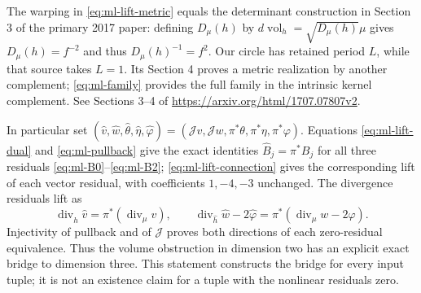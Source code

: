 The warping in \eqref{eq:ml-lift-metric} equals the determinant construction
in Section 3 of the primary 2017 paper: defining
$D_\mu(h)$ by $d\operatorname{vol}_h=\sqrt{D_\mu(h)}\mu$ gives
$D_\mu(h)=f^{-2}$ and thus $D_\mu(h)^{-1}=f^2$.
Our circle has retained period $L$, while that source takes $L=1$.
Its Section 4 proves a metric realization by another complement;
\eqref{eq:ml-family} provides the full family in the intrinsic kernel
complement. See Sections 3--4 of
\url{https://arxiv.org/html/1707.07807v2}.

In particular set
$(\widehat v,\widehat w,\widehat\theta,\widehat\eta,
\widehat\varphi)=(\mathcal Jv,\mathcal Jw,
\pi^*\theta,\pi^*\eta,\pi^*\varphi)$. Equations
\eqref{eq:ml-lift-dual} and \eqref{eq:ml-pullback} give the exact
identities $\widehat B_j=\pi^*B_j$ for all three residuals
\eqref{eq:ml-B0}--\eqref{eq:ml-B2};
\eqref{eq:ml-lift-connection} gives the corresponding lift of each vector
residual, with coefficients $1,-4,-3$ unchanged. The divergence residuals
lift as
\[
 \operatorname{div}_{\widehat h}\widehat v
       =\pi^*(\operatorname{div}_\mu v),\qquad
 \operatorname{div}_{\widehat h}\widehat w-2\widehat\varphi
       =\pi^*(\operatorname{div}_\mu w-2\varphi).
\]
Injectivity of pullback and of $\mathcal J$ proves both directions of
each zero-residual equivalence. Thus the volume obstruction in dimension
two has an explicit exact bridge to dimension three. This statement
constructs the bridge for every input tuple; it is not an existence claim
for a tuple with the nonlinear residuals zero.

